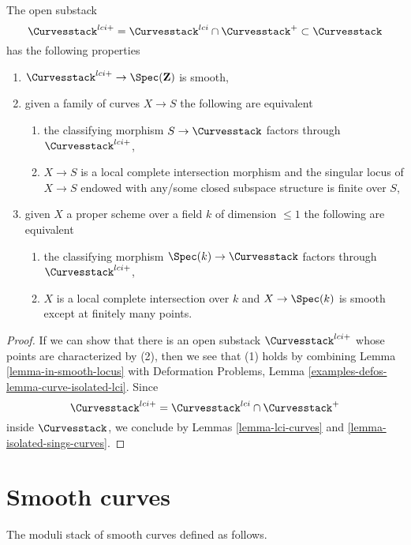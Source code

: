 \begin{lemma}
\label{lemma-big-smooth-part-curves}
The open substack
$$
\Curvesstack^{lci+} =
\Curvesstack^{lci} \cap \Curvesstack^{+}
\subset \Curvesstack
$$
has the following properties
\begin{enumerate}
\item $\Curvesstack^{lci+} \to \Spec(\mathbf{Z})$ is smooth,
\item given a family of curves $X \to S$ the following are equivalent
\begin{enumerate}
\item the classifying morphism $S \to \Curvesstack$ factors through
$\Curvesstack^{lci+}$,
\item $X \to S$ is a local complete intersection morphism and
the singular locus of $X \to S$ endowed with any/some closed subspace
structure is finite over $S$,
\end{enumerate}
\item given $X$ a proper scheme over a field $k$ of dimension $\leq 1$
the following are equivalent
\begin{enumerate}
\item the classifying morphism $\Spec(k) \to \Curvesstack$ factors
through $\Curvesstack^{lci+}$,
\item $X$ is a local complete intersection over $k$ and
$X \to \Spec(k)$ is smooth except at finitely many points.
\end{enumerate}
\end{enumerate}
\end{lemma}

\begin{proof}
If we can show that there is an open substack $\Curvesstack^{lci+}$
whose points are characterized by (2), then we see that
(1) holds by combining Lemma \ref{lemma-in-smooth-locus} with
Deformation Problems, Lemma \ref{examples-defos-lemma-curve-isolated-lci}.
Since
$$
\Curvesstack^{lci+} = \Curvesstack^{lci} \cap \Curvesstack^{+}
$$
inside $\Curvesstack$, we conclude by
Lemmas \ref{lemma-lci-curves} and \ref{lemma-isolated-sings-curves}.
\end{proof}




\section{Smooth curves}
\label{section-smooth-curves}

\noindent
The moduli stack of smooth curves defined as follows.

